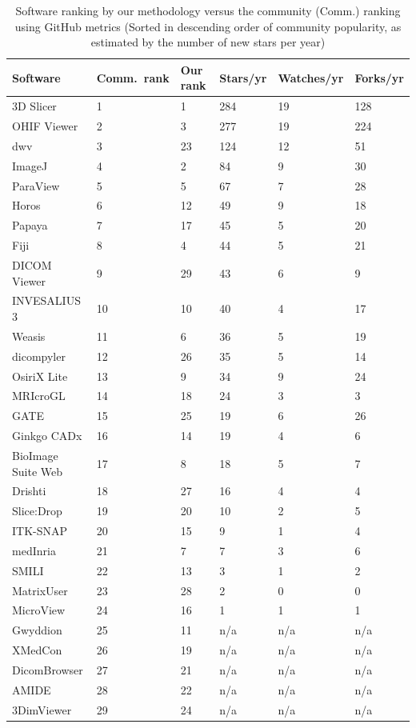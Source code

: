 \documentclass[final, 3p, times, authoryear]{elsarticle}
\begin{document}
\begingroup
\renewcommand{\arraystretch}{0.85}
\begin{table}[!ht]
\centering
\begin{tabular}{llllll}
\toprule
Software & Comm.\ rank & Our rank & Stars/yr & Watches/yr & Forks/yr \\ 
\midrule
3D Slicer & 1 & 1 & 284 & 19 & 128 \\
OHIF Viewer & 2 & 3 & 277 & 19 & 224 \\
dwv & 3 & 23 & 124 & 12 & 51 \\
ImageJ & 4 & 2 & 84 & 9 & 30 \\
ParaView & 5 & 5 & 67 & 7 & 28 \\
Horos & 6 & 12 & 49 & 9 & 18 \\
Papaya & 7 & 17 & 45 & 5 & 20 \\
Fiji & 8 & 4 & 44 & 5 & 21 \\
DICOM Viewer & 9 & 29 & 43 & 6 & 9 \\
INVESALIUS 3 & 10 & 10 & 40 & 4 & 17 \\
Weasis & 11 & 6 & 36 & 5 & 19 \\
dicompyler & 12 & 26 & 35 & 5 & 14 \\
OsiriX Lite & 13 & 9 & 34 & 9 & 24 \\
MRIcroGL & 14 & 18 & 24 & 3 & 3 \\
GATE & 15 & 25 & 19 & 6 & 26 \\
Ginkgo CADx & 16 & 14 & 19 & 4 & 6 \\
BioImage Suite Web & 17 & 8 & 18 & 5 & 7 \\
Drishti & 18 & 27 & 16 & 4 & 4 \\
Slice:Drop & 19 & 20 & 10 & 2 & 5 \\
ITK-SNAP & 20 & 15 & 9 & 1 & 4 \\
medInria & 21 & 7 & 7 & 3 & 6 \\
SMILI & 22 & 13 & 3 & 1 & 2 \\
MatrixUser & 23 & 28 & 2 & 0 & 0 \\
MicroView & 24 & 16 & 1 & 1 & 1 \\
Gwyddion & 25 & 11 & n/a & n/a & n/a \\
XMedCon & 26 & 19 & n/a & n/a & n/a \\
DicomBrowser & 27 & 21 & n/a & n/a & n/a \\
AMIDE & 28 & 22 & n/a & n/a & n/a \\
3DimViewer & 29 & 24 & n/a & n/a & n/a \\ 
\bottomrule
\end{tabular}
\caption{Software ranking by our methodology versus the community (Comm.)
ranking using GitHub metrics (Sorted in descending order of community
popularity, as estimated by the number of new stars per year)}
\label{tab_ranking_vs_GitHub}
\end{table}
\endgroup
\end{document}
